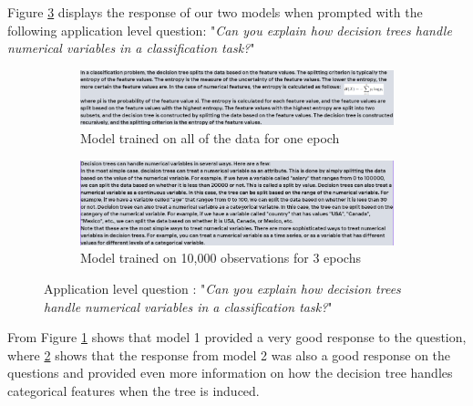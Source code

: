 \documentclass[10pt]{article}
\begin{document}
Figure \ref{fig: Q2} displays the response of our two models when prompted with the following application
level question: "\textit{Can you explain how decision trees handle numerical variables in a classification task?}"
\begin{figure}[H]
    \centering
    \begin{subfigure}[b]{0.45\textwidth}
        \centering
        \includegraphics[width=\textwidth]{Images/1EpochQ2.png}
        \caption{Model trained on all of the data for one epoch}
        \label{fig: Q2_Model1}
    \end{subfigure}
    \hfill
    \begin{subfigure}[b]{0.5\textwidth}
        \centering
        \includegraphics[width=\textwidth]{Images/10kQ2.png}
        \caption{Model trained on 10,000 observations for 3 epochs}
        \label{fig: Q2_Model2}
    \end{subfigure}
    \caption{Application level question : "\textit{Can you explain how decision trees handle numerical variables in a classification task?}"}
    \label{fig: Q2}
\end{figure}
From Figure \ref{fig: Q2_Model1} shows that model 1 provided a very good response
to the question, where \ref{fig: Q2_Model2} shows that the response from model
2 was also a good response on the questions and provided even more information
on how the decision tree handles categorical features when the tree is induced.
\end{document}
